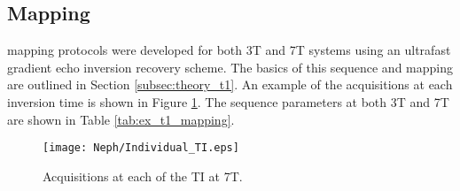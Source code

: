 \subsection{\tone Mapping}
\tone mapping protocols were developed for both 3T and 7T systems using an ultrafast gradient echo inversion recovery scheme. The basics of this sequence and \tone mapping are outlined in Section \ref{subsec:theory_t1}. An example of the acquisitions at each inversion time is shown in Figure \ref{fig:ex_ir_data}. The sequence parameters at both 3T and 7T are shown in Table \ref{tab:ex_t1_mapping}.
\begin{figure}[H]
	\centering
	\texttt{[image: Neph/Individual\_TI.eps]}
	\caption{Acquisitions at each of the \ac{TI} at 7T.}
	\label{fig:ex_ir_data}	
\end{figure}

